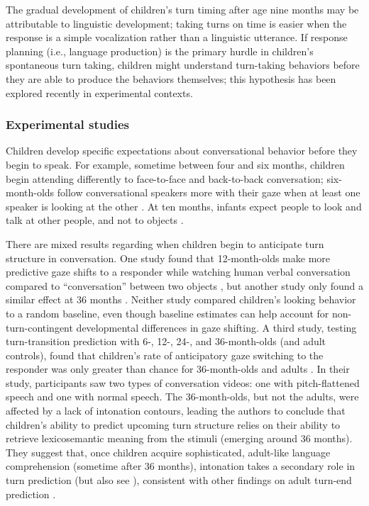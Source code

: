 \documentclass[authoryear, 12pt]{elsarticle}
\begin{document}
The gradual development of children's turn timing after age nine months may be attributable to linguistic development; taking turns on time is easier when the response is a simple vocalization rather than a linguistic utterance. If response planning (i.e., language production) is the primary hurdle in children's spontaneous turn taking, children might understand turn-taking behaviors before they are able to produce the behaviors themselves; this hypothesis has been explored recently in experimental contexts.

\subsubsection{Experimental studies}

Children develop specific expectations about conversational behavior before they begin to speak. For example, sometime between four and six months, children begin attending differently to face-to-face and back-to-back conversation; six-month-olds follow conversational speakers more with their gaze when at least one speaker is looking at the other \citep{augusti2010}. At ten months, infants expect people to look and talk at other people, and not to objects \citep{beier2012}.

There are mixed results regarding when children begin to anticipate turn structure in conversation. One study found that 12-month-olds make more predictive gaze shifts to a responder while watching human verbal conversation compared to ``conversation'' between two objects \citep{bakker2011}, but another study only found a similar effect at 36 months \citep{hofsten2009}. Neither study compared children's looking behavior to a random baseline, even though baseline estimates can help account for non-turn-contingent developmental differences in gaze shifting. A third study, testing turn-transition prediction with 6-, 12-, 24-, and 36-month-olds (and adult controls), found that children's rate of anticipatory gaze switching to the responder was only greater than chance for 36-month-olds and adults \citep{keitel2013}. In their study, participants saw two types of conversation videos: one with pitch-flattened speech and one with normal speech. The 36-month-olds, but not the adults, were affected by a lack of intonation contours, leading the authors to conclude that children's ability to predict upcoming turn structure relies on their ability to retrieve lexicosemantic meaning from the stimuli (emerging around 36 months). They suggest that, once children acquire sophisticated, adult-like language comprehension (sometime after 36 months),  intonation takes a secondary role in turn prediction (but also see \citealp{keitel2015}), consistent with other findings on adult turn-end prediction \citep{ruiter2006}.
\end{document}
